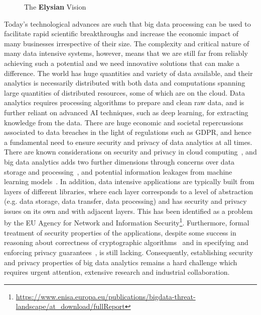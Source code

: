 \documentclass[a4paper,11pt]{article}
\newcommand{\project}[1]{\textbf{#1}\xspace}
\newcommand{\SECURITY}{\project{Elysian}}
\newcommand{\TheProject}{\SECURITY}
\begin{document}
\begin{figure}[tp]
  \begin{center}
  \vspace{-5mm}
  \caption{The \TheProject{} Vision}
  \label{fig:vision}
  \end{center}
  \end{figure}
Today's technological advances are such that big data processing can be used to facilitate rapid scientific breakthroughs and increase the economic impact of many businesses irrespective of their size. The complexity and critical nature of many data intensive systems, however,
means that we are still far from reliably achieving such a potential and we need innovative solutions that can make a difference. The world has huge quantities and variety of
data available, and their analytics is necessarily distributed with both data and computations spanning large quantities of distributed resources, some of which are on  the cloud. 
Data analytics requires processing algorithms to prepare 
and clean raw data, and is further reliant on advanced AI techniques, such as deep learning, for
extracting knowledge from the data.
There are huge economic and societal repercussions associated to data breaches in the light of regulations such as GDPR, and hence a fundamental need to
ensure security and privacy of data analytics at all times.
There are known considerations on security and privacy in cloud computing~\cite{cloudSecurity}, and big data analytics adds two further dimensions through
concerns over data storage and processing~\cite{bigdatasecurity}, and potential information leakages from machine learning models~\cite{mlSecurity}.
In addition, data intensive applications are typically built from layers of different libraries, where each layer corresponds to a level of abstraction (e.g. data storage, data transfer, data processing) and has security and privacy issues on its own and with adjacent layers. This has been identified as a problem by the EU Agency for Network and Information Security\footnote{\url{https://www.enisa.europa.eu/publications/bigdata-threat-landscape/at_download/fullReport}}. Furthermore, formal treatment of security properties of the applications, despite some success in reasoning about correctness of cryptographic algorithms~\cite{FM-crypto} and in specifying and enforcing privacy guarantees~\cite{FM-priv-guarantee}, is still lacking. Consequently,
establishing security and privacy properties of big data analytics remains 
a hard challenge which requires urgent attention, extensive research and industrial collaboration.
\end{document}
